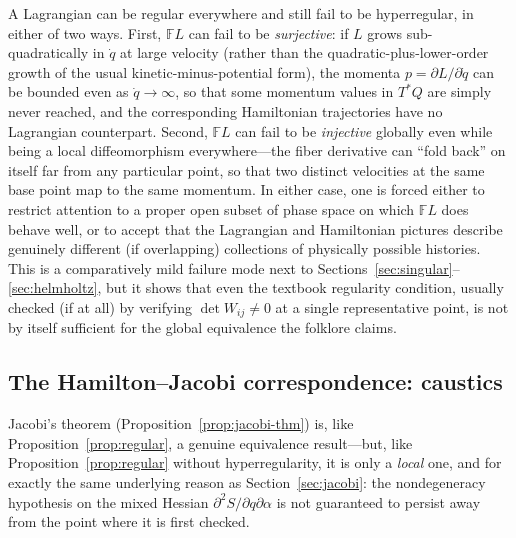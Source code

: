 \documentclass[11pt]{article}
\newcommand{\FL}{\mathbb{F}L}
\begin{document}
A Lagrangian can be regular everywhere and still fail to be hyperregular, in either of two ways. First, $\FL$ can fail to be \emph{surjective}: if $L$ grows sub-quadratically in $\dot q$ at large velocity (rather than the quadratic-plus-lower-order growth of the usual kinetic-minus-potential form), the momenta $p=\partial L/\partial\dot q$ can be bounded even as $\dot q\to\infty$, so that some momentum values in $T^*Q$ are simply never reached, and the corresponding Hamiltonian trajectories have no Lagrangian counterpart. Second, $\FL$ can fail to be \emph{injective} globally even while being a local diffeomorphism everywhere---the fiber derivative can ``fold back'' on itself far from any particular point, so that two distinct velocities at the same base point map to the same momentum. In either case, one is forced either to restrict attention to a proper open subset of phase space on which $\FL$ does behave well, or to accept that the Lagrangian and Hamiltonian pictures describe genuinely different (if overlapping) collections of physically possible histories. This is a comparatively mild failure mode next to Sections~\ref{sec:singular}--\ref{sec:helmholtz}, but it shows that even the textbook regularity condition, usually checked (if at all) by verifying $\det W_{ij}\neq 0$ at a single representative point, is not by itself sufficient for the global equivalence the folklore claims.

\subsection{The Hamilton--Jacobi correspondence: caustics}
\label{sec:caustics}

Jacobi's theorem (Proposition~\ref{prop:jacobi-thm}) is, like Proposition~\ref{prop:regular}, a genuine equivalence result---but, like Proposition~\ref{prop:regular} without hyperregularity, it is only a \emph{local} one, and for exactly the same underlying reason as Section~\ref{sec:jacobi}: the nondegeneracy hypothesis on the mixed Hessian $\partial^2S/\partial q\partial\alpha$ is not guaranteed to persist away from the point where it is first checked.
\end{document}
